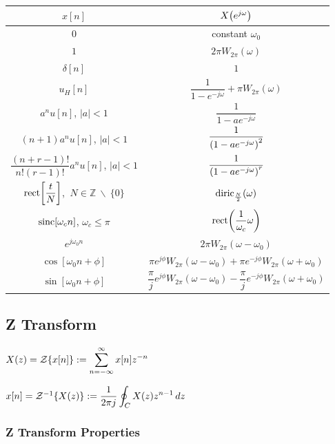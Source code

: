 \documentclass[11pt]{article}
\begin{document}
  \bgroup
  \renewcommand{\arraystretch}{2}
  \setlength{\tabcolsep}{1.2cm}
  \large\begin{tabular}{c|c}
    \(x[n]\) & \(X{\left( e^{j\omega} \right)}\) \\
    \toprule
    \(0\) & constant \(\omega_0\) \\
    \(1\) & \(2\pi W_{2\pi}(\omega)\) \\
    \(\delta[n]\) & \(1\) \\
    \(u_H[n]\) & \(\dfrac{1}{1 - e^{-j\omega}} + \pi W_{2\pi}(\omega)\) \\
    \(a^n u[n]\), \(|a| < 1\) & \(\dfrac{1}{1 - ae^{-j\omega}}\) \\
    \((n + 1)a^n u[n]\), \(|a| < 1\) & \(\dfrac{1}{{\left( 1 - ae^{-j\omega} \right)}^2}\) \\
    \(\dfrac{(n + r - 1)!}{n!(r - 1)!}a^n u[n]\), \(|a| < 1\) & \(\dfrac{1}{{\left( 1 - ae^{-j\omega} \right)}^r}\) \\
    \(\mathrm{rect}{\left[ \dfrac{t}{N} \right]}\), \(\ N \in \mathbb{Z}\ \backslash\ \{0\}\) &
      \(\mathrm{diric}_{\frac{N}{2}}(\omega)\) \\
    \(\mathrm{sinc}[\omega_c n]\), \(\omega_c \le \pi\) & \(\mathrm{rect}{\left( \dfrac{1}{\omega_c}\omega \right)}\) \\
    \(e^{j\omega_0 n}\) & \(2\pi W_{2\pi}(\omega - \omega_0)\) \\
    \(\cos[\omega_0 n + \phi]\) & \(\pi e^{j\phi}W_{2\pi}(\omega - \omega_0) + \pi e^{-j\phi}W_{2\pi}(\omega + \omega_0)\) \\
    \(\sin[\omega_0 n + \phi]\) & \(\dfrac{\pi}{j} e^{j\phi}W_{2\pi}(\omega - \omega_0) -
    \dfrac{\pi}{j} e^{-j\phi}W_{2\pi}(\omega + \omega_0)\) \\
  \end{tabular}
  \egroup

  \pagebreak

  \subsection{Z Transform}
  \begin{multicols}{2}
    \(X(z) = \mathcal{Z}{\left\{ x[n] \right\}} := \displaystyle \sum_{n = -\infty}^{\infty} x[n]z^{-n}\)

    \columnbreak

    \(x[n] = \mathcal{Z}^{-1}{\left\{ X(z) \right\}} := \displaystyle \dfrac{1}{2\pi j} \oint_{C} X(z)z^{n - 1}\, dz\)
  \end{multicols}

  \subsubsection{Z Transform Properties}
\end{document}
